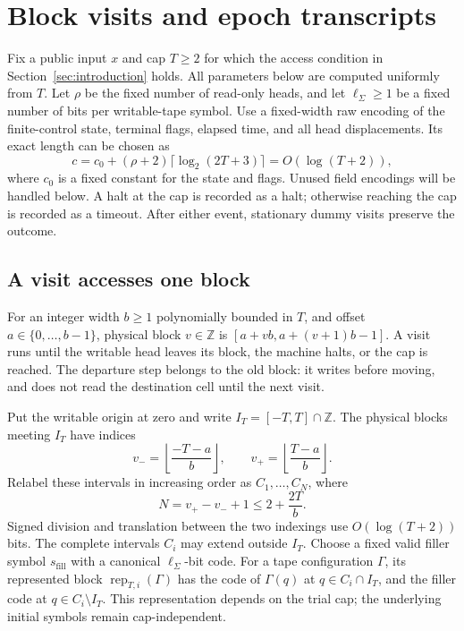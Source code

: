 \section{Block visits and epoch transcripts}
\label{sec:simulation}

Fix a public input \(x\) and cap \(T\ge2\) for which the access
condition in Section~\ref{sec:introduction} holds. All parameters below
are computed uniformly from \(T\). Let \(\rho\) be the fixed number of
read-only heads, and let \(\ell_\Sigma\ge1\) be a fixed number of bits
per writable-tape symbol. Use a fixed-width raw encoding of the
finite-control state, terminal flags, elapsed time, and all head
displacements. Its exact length can be chosen as
\[
 c=c_0+(\rho+2)\lceil\log_2(2T+3)\rceil=O(\log(T+2)),
\]
where \(c_0\) is a fixed constant for the state and flags. Unused field
encodings will be handled below. A halt at the cap is recorded as a
halt; otherwise reaching the cap is recorded as a timeout. After
either event, stationary dummy visits preserve the outcome.

\subsection{A visit accesses one block}

For an integer width \(b\ge1\) polynomially bounded in \(T\), and offset
\(a\in\{0,\ldots,b-1\}\), physical block \(v\in\mathbb Z\) is
\([a+vb,a+(v+1)b-1]\).
A visit runs until the writable head leaves its block, the machine
halts, or the cap is reached. The departure step belongs to the old
block: it writes before moving, and does not read the destination
cell until the next visit.

Put the writable origin at zero and write \(I_T=[-T,T]\cap\mathbb Z\).
The physical blocks meeting \(I_T\) have indices
\[
 v_-=\left\lfloor\frac{-T-a}{b}\right\rfloor,\qquad
 v_+=\left\lfloor\frac{T-a}{b}\right\rfloor.
\]
Relabel these intervals in increasing order as \(C_1,\ldots,C_N\), where
\begin{equation}\label{eq:block-count}
 N=v_+-v_-+1\le 2+\frac{2T}{b}.
\end{equation}
Signed division and translation between the two indexings use
\(O(\log(T+2))\) bits. The complete intervals \(C_i\) may extend
outside \(I_T\). Choose a fixed valid filler symbol \(s_{\mathrm{fill}}\)
with a canonical \(\ell_\Sigma\)-bit code. For a tape configuration
\(\Gamma\), its represented block \(\operatorname{rep}_{T,i}(\Gamma)\)
has the code of \(\Gamma(q)\) at \(q\in C_i\cap I_T\), and the filler
code at \(q\in C_i\setminus I_T\). This representation depends on the
trial cap; the underlying initial symbols remain cap-independent.

